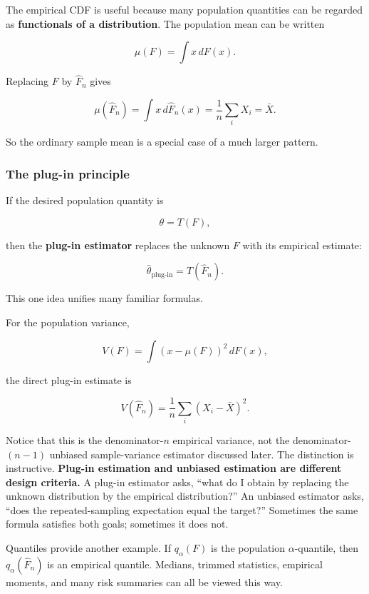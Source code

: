 The empirical CDF is useful because many population quantities can be regarded as \textbf{functionals of a distribution}. The population mean can be written

\[
\mu(F)=\int x\,dF(x).
\]

Replacing \(F\) by \(\widehat F_n\) gives

\[
\mu(\widehat F_n)
=
\int x\,d\widehat F_n(x)
=
\frac1n\sum_iX_i
=
\bar X.
\]

So the ordinary sample mean is a special case of a much larger pattern.

\subsubsection{The plug-in principle}\label{02-foundations-ii-ch030-the-plug-in-principle}

\hypertarget{02-foundations-ii-ch030-the-plug-in-principle}{}

If the desired population quantity is

\[
\theta=T(F),
\]

then the \textbf{plug-in estimator} replaces the unknown \(F\) with its empirical estimate:

\[
\boxed{
\widehat\theta_{\mathrm{plug\text{-}in}}
=
T(\widehat F_n)
}.
\]

This one idea unifies many familiar formulas.

For the population variance,

\[
V(F)=
\int (x-\mu(F))^2\,dF(x),
\]

the direct plug-in estimate is

\[
V(\widehat F_n)
=
\frac1n\sum_i(X_i-\bar X)^2.
\]

Notice that this is the denominator-\(n\) empirical variance, not the denominator-\((n-1)\) unbiased sample-variance estimator discussed later. The distinction is instructive. \textbf{Plug-in estimation and unbiased estimation are different design criteria.} A plug-in estimator asks, ``what do I obtain by replacing the unknown distribution by the empirical distribution?'' An unbiased estimator asks, ``does the repeated-sampling expectation equal the target?'' Sometimes the same formula satisfies both goals; sometimes it does not.

Quantiles provide another example. If \(q_\alpha(F)\) is the population \(\alpha\)-quantile, then \(q_\alpha(\widehat F_n)\) is an empirical quantile. Medians, trimmed statistics, empirical moments, and many risk summaries can all be viewed this way.

